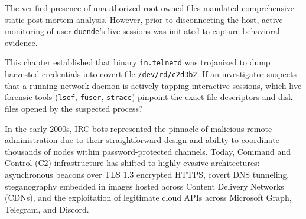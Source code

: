 \vspace{1em}

The verified presence of unauthorized root-owned files mandated comprehensive static post-mortem analysis. However, prior to disconnecting the host, active monitoring of user \texttt{duende}'s live sessions was initiated to capture behavioral evidence.

\begin{retoforense}
This chapter established that binary \texttt{in.telnetd} was trojanized to dump harvested credentials into covert file \texttt{/dev/rd/c2d3b2}. If an investigator suspects that a running network daemon is actively tapping interactive sessions, which live forensic tools (\texttt{lsof}, \texttt{fuser}, \texttt{strace}) pinpoint the exact file descriptors and disk files opened by the suspected process?
\end{retoforense}

\begin{perspectiva20}
In the early 2000s, IRC bots represented the pinnacle of malicious remote administration due to their straightforward design and ability to coordinate thousands of nodes within password-protected channels. Today, Command and Control (C2) infrastructure has shifted to highly evasive architectures: asynchronous beacons over TLS 1.3 encrypted HTTPS, covert DNS tunneling, steganography embedded in images hosted across Content Delivery Networks (CDNs), and the exploitation of legitimate cloud APIs across Microsoft Graph, Telegram, and Discord.
\end{perspectiva20}
